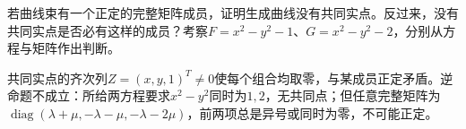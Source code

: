 若曲线束有一个正定的完整矩阵成员，证明生成曲线没有共同实点。反过来，没有共同实点是否必有这样的成员？考察\(F=x^2-y^2-1\)、\(G=x^2-y^2-2\)，分别从方程与矩阵作出判断。
\par
\solutionanswer
共同实点的齐次列\(Z=(x,y,1)^T\ne0\)使每个组合均取零，与某成员正定矛盾。逆命题不成立：所给两方程要求\(x^2-y^2\)同时为\(1,2\)，无共同点；但任意完整矩阵为\(\operatorname{diag}(\lambda+\mu,-\lambda-\mu,-\lambda-2\mu)\)，前两项总是异号或同时为零，不可能正定。
\par

